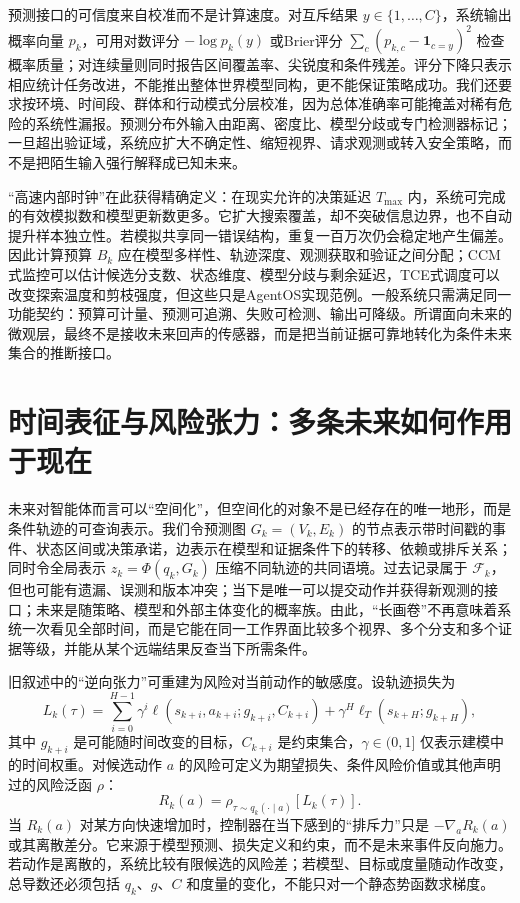 预测接口的可信度来自校准而不是计算速度。对互斥结果 $y\in\{1,\ldots,C\}$，系统输出概率向量 $p_k$，可用对数评分 $-\log p_k(y)$ 或Brier评分 $\sum_c(p_{k,c}-\mathbf{1}_{c=y})^2$ 检查概率质量；对连续量则同时报告区间覆盖率、尖锐度和条件残差。评分下降只表示相应统计任务改进，不能推出整体世界模型同构，更不能保证策略成功。我们还要求按环境、时间段、群体和行动模式分层校准，因为总体准确率可能掩盖对稀有危险的系统性漏报。预测分布外输入由距离、密度比、模型分歧或专门检测器标记；一旦超出验证域，系统应扩大不确定性、缩短视界、请求观测或转入安全策略，而不是把陌生输入强行解释成已知未来。

“高速内部时钟”在此获得精确定义：在现实允许的决策延迟 $T_{\max}$ 内，系统可完成的有效模拟数和模型更新数更多。它扩大搜索覆盖，却不突破信息边界，也不自动提升样本独立性。若模拟共享同一错误结构，重复一百万次仍会稳定地产生偏差。因此计算预算 $B_k$ 应在模型多样性、轨迹深度、观测获取和验证之间分配；CCM式监控可以估计候选分支数、状态维度、模型分歧与剩余延迟，TCE式调度可以改变探索温度和剪枝强度，但这些只是AgentOS实现范例。一般系统只需满足同一功能契约：预算可计量、预测可追溯、失败可检测、输出可降级。所谓面向未来的微观层，最终不是接收未来回声的传感器，而是把当前证据可靠地转化为条件未来集合的推断接口。

\section{时间表征与风险张力：多条未来如何作用于现在}

未来对智能体而言可以“空间化”，但空间化的对象不是已经存在的唯一地形，而是条件轨迹的可查询表示。我们令预测图 $G_k=(V_k,E_k)$ 的节点表示带时间戳的事件、状态区间或决策承诺，边表示在模型和证据条件下的转移、依赖或排斥关系；同时令全局表示 $z_k=\Phi(q_k,G_k)$ 压缩不同轨迹的共同语境。过去记录属于 $\mathcal{F}_k$，但也可能有遗漏、误测和版本冲突；当下是唯一可以提交动作并获得新观测的接口；未来是随策略、模型和外部主体变化的概率族。由此，“长画卷”不再意味着系统一次看见全部时间，而是它能在同一工作界面比较多个视界、多个分支和多个证据等级，并能从某个远端结果反查当下所需条件。

旧叙述中的“逆向张力”可重建为风险对当前动作的敏感度。设轨迹损失为
\[
L_k(\tau)=\sum_{i=0}^{H-1}\gamma^i\ell(s_{k+i},a_{k+i};g_{k+i},C_{k+i})
+\gamma^H\ell_T(s_{k+H};g_{k+H}),
\]
其中 $g_{k+i}$ 是可能随时间改变的目标，$C_{k+i}$ 是约束集合，$\gamma\in(0,1]$ 仅表示建模中的时间权重。对候选动作 $a$ 的风险可定义为期望损失、条件风险价值或其他声明过的风险泛函 $\rho$：
\[
R_k(a)=\rho_{\tau\sim q_k(\cdot\mid a)}[L_k(\tau)].
\]
当 $R_k(a)$ 对某方向快速增加时，控制器在当下感到的“排斥力”只是 $-\nabla_aR_k(a)$ 或其离散差分。它来源于模型预测、损失定义和约束，而不是未来事件反向施力。若动作是离散的，系统比较有限候选的风险差；若模型、目标或度量随动作改变，总导数还必须包括 $q_k$、$g$、$C$ 和度量的变化，不能只对一个静态势函数求梯度。

